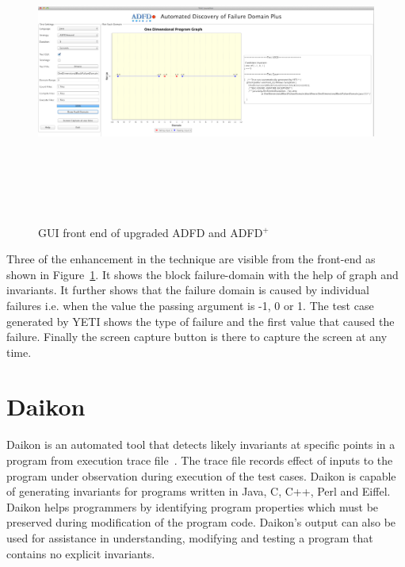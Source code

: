 \bigskip
\begin{figure}[ht]
\centering
\includegraphics[width= 15.5cm,height=10cm]{chapter7/adfdUpgraded.png}
\bigskip
\caption{GUI front end of upgraded ADFD and ADFD$^+$}
\label{fig:adfdUpgraded}
\end{figure}
\bigskip

Three of the enhancement in the technique are visible from the front-end as shown in Figure~\ref{fig:adfdUpgraded}. It shows the block failure-domain with the help of graph and invariants. It further shows that the failure domain is caused by individual failures i.e. when the value the passing argument is -1, 0 or 1. The test case generated by YETI shows the type of failure and the first value that caused the failure. Finally the screen capture button is there to capture the screen at any time.


\section{Daikon}
Daikon is an automated tool that detects likely invariants at specific points in a program from execution trace file~\cite{ernst2007daikon}. The trace file records effect of inputs to the program under observation during execution of the test cases. Daikon is capable of generating invariants for programs written in Java, C, C++, Perl and Eiffel. Daikon helps programmers by identifying program properties which must be preserved during modification of the program code. Daikon's output can also be used for assistance in understanding, modifying and testing a program that contains no explicit invariants.

